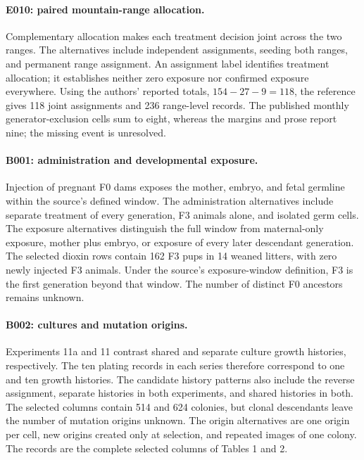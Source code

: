 \paragraph{E010: paired mountain-range allocation.}
Complementary allocation makes each treatment decision joint across the two ranges. The alternatives include independent assignments, seeding both ranges, and permanent range assignment. An assignment label identifies treatment allocation; it establishes neither zero exposure nor confirmed exposure everywhere. Using the authors' reported totals, $154-27-9=118$, the reference gives 118 joint assignments and 236 range-level records. The published monthly generator-exclusion cells sum to eight, whereas the margins and prose report nine; the missing event is unresolved.

\paragraph{B001: administration and developmental exposure.}
Injection of pregnant F0 dams exposes the mother, embryo, and fetal germline within the source's defined window.
The administration alternatives include separate treatment of every generation, F3 animals alone, and isolated germ cells.
The exposure alternatives distinguish the full window from maternal-only exposure, mother plus embryo, or exposure of every later descendant generation. The selected dioxin rows contain 162 F3 pups in 14 weaned litters, with zero newly injected F3 animals. Under the source's exposure-window definition, F3 is the first generation beyond that window. The number of distinct F0 ancestors remains unknown.

\paragraph{B002: cultures and mutation origins.}
Experiments 11a and 11 contrast shared and separate culture growth histories, respectively. The ten plating records in each series therefore correspond to one and ten growth histories. The candidate history patterns also include the reverse assignment, separate histories in both experiments, and shared histories in both. The selected columns contain 514 and 624 colonies, but clonal descendants leave the number of mutation origins unknown. The origin alternatives are one origin per cell, new origins created only at selection, and repeated images of one colony. The records are the complete selected columns of Tables 1 and 2.

